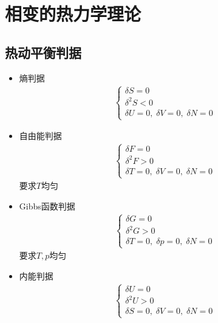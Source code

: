 \chapter{相变的热力学理论}

\section{热动平衡判据}

\begin{itemize}
    \item 熵判据
    \begin{gather*}
        \begin{cases}
            \delta S = 0
            \\
            \delta^2 S < 0
            \\
            \delta U = 0,\;\delta V = 0,\;\delta N = 0
        \end{cases}
    \end{gather*}
    \item 自由能判据
    \begin{gather*}
        \begin{cases}
            \delta F = 0
            \\
            \delta^2 F > 0
            \\
            \delta T = 0,\;\delta V = 0,\;\delta N = 0
        \end{cases}
    \end{gather*}
    要求$T$均匀
    \item Gibbs函数判据
    \begin{gather*}
        \begin{cases}
            \delta G = 0
            \\
            \delta^2 G > 0
            \\
            \delta T = 0,\;\delta p = 0,\;\delta N = 0
        \end{cases}
    \end{gather*}
    要求$T, p$均匀
    \item 内能判据
    \begin{gather*}
        \begin{cases}
            \delta U = 0
            \\
            \delta^2 U > 0
            \\
            \delta S = 0,\;\delta V = 0,\;\delta N = 0
        \end{cases}
    \end{gather*}
\end{itemize}

